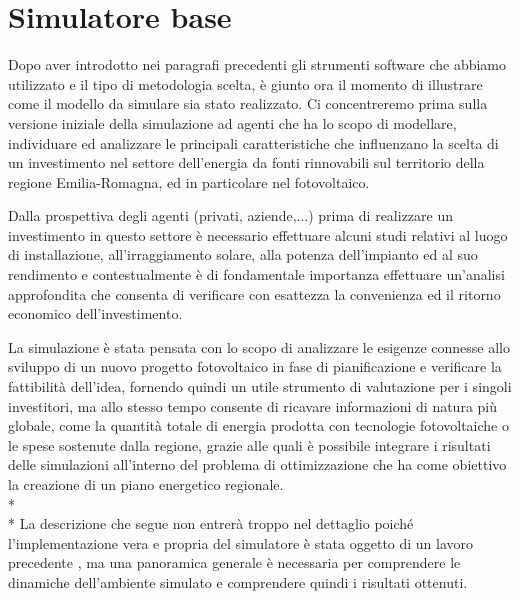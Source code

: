 \section{Simulatore base}


Dopo aver introdotto nei paragrafi precedenti gli strumenti software che abbiamo utilizzato e il tipo di metodologia scelta, è giunto ora il momento di illustrare come il modello da simulare sia stato realizzato. Ci concentreremo prima sulla versione iniziale della simulazione ad agenti che ha lo scopo di modellare, individuare ed analizzare le principali caratteristiche che influenzano la scelta di un investimento nel settore dell'energia da fonti rinnovabili sul territorio della regione Emilia-Romagna, ed in particolare nel fotovoltaico.

Dalla prospettiva degli agenti (privati, aziende,...) prima di realizzare un investimento in questo settore è necessario effettuare alcuni studi relativi al luogo di installazione, all'irraggiamento solare, alla potenza dell'impianto ed al suo rendimento e contestualmente è di fondamentale importanza effettuare un'analisi approfondita che consenta di verificare con esattezza la convenienza ed il ritorno economico dell'investimento.

La simulazione è stata pensata con lo scopo di analizzare le esigenze connesse allo sviluppo di un nuovo progetto  fotovoltaico in fase di pianificazione e verificare la fattibilità dell'idea, fornendo quindi un utile strumento di valutazione per i singoli investitori, ma allo stesso tempo consente di ricavare informazioni di natura più globale, come la quantità totale di energia prodotta con tecnologie fotovoltaiche o le spese sostenute dalla regione, grazie alle quali è possibile integrare i risultati delle simulazioni all'interno del problema di ottimizzazione che ha come obiettivo la creazione di un piano energetico regionale.\\* \\*
La descrizione che segue non entrerà troppo nel dettaglio poiché l'implementazione vera e propria del simulatore è stata oggetto di un lavoro precedente \cite{tesiCroce}, ma una panoramica generale è necessaria per comprendere le dinamiche dell'ambiente simulato e comprendere quindi i risultati ottenuti.

